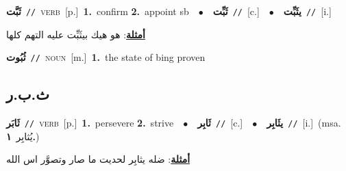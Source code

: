 \documentclass[10pt,a4paper,twoside]{article} %
\begin{document}
\begin{multicols}{2}
{\setlength\topsep{0pt}\textbf{\foreignlanguage{arabic}{ثَبَّت}}\ {\color{gray}\texttt{//}\color{black}}\ \textsc{verb}\ [p.]\ \textbf{1.}~confirm  \textbf{2.}~appoint sb\ \ $\bullet$\ \ \setlength\topsep{0pt}\textbf{\foreignlanguage{arabic}{ثَبِّت}}\ {\color{gray}\texttt{//}\color{black}}\ [c.]\ \ $\bullet$\ \ \setlength\topsep{0pt}\textbf{\foreignlanguage{arabic}{يثَبِّت}}\ {\color{gray}\texttt{//}\color{black}}\ [i.]\  \begin{flushright}\color{gray}\foreignlanguage{arabic}{\textbf{\underline{\foreignlanguage{arabic}{أمثلة}}}: هو هيك بيثَبِّت عليه التهم كلها}\end{flushright}\color{black}} \vspace{2mm}

{\setlength\topsep{0pt}\textbf{\foreignlanguage{arabic}{ثُبُوت}}\ {\color{gray}\texttt{//}\color{black}}\ \textsc{noun}\ [m.]\ \textbf{1.}~the state of bing proven\ } \vspace{2mm}

\vspace{-3mm}
\subsection*{\color{blue}\foreignlanguage{arabic}{ث.ب.ر}\color{blue}{}} 

{\setlength\topsep{0pt}\textbf{\foreignlanguage{arabic}{ثَابَر}}\ {\color{gray}\texttt{//}\color{black}}\ \textsc{verb}\ [p.]\ \textbf{1.}~persevere  \textbf{2.}~strive\ \ $\bullet$\ \ \setlength\topsep{0pt}\textbf{\foreignlanguage{arabic}{ثَابِر}}\ {\color{gray}\texttt{//}\color{black}}\ [c.]\ \ $\bullet$\ \ \setlength\topsep{0pt}\textbf{\foreignlanguage{arabic}{يثَابِر}}\ {\color{gray}\texttt{//}\color{black}}\ [i.]\ \color{gray}(msa. \foreignlanguage{arabic}{يُثابِر}~\foreignlanguage{arabic}{\textbf{١.}})\color{black}\  \begin{flushright}\color{gray}\foreignlanguage{arabic}{\textbf{\underline{\foreignlanguage{arabic}{أمثلة}}}: ضله يثابِر لحديت ما صار وتصوَّر اس الله}\end{flushright}\color{black}} \vspace{2mm}


\end{multicols}
\end{document}
